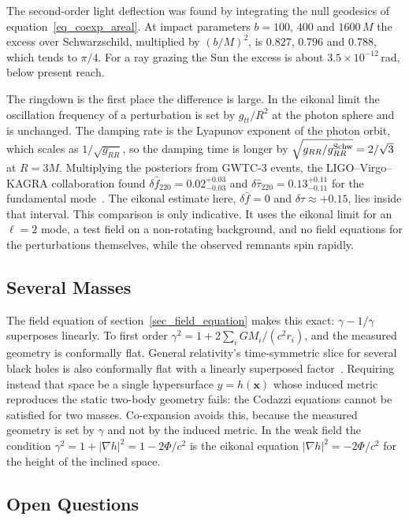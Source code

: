 The second-order light deflection was found by integrating the null geodesics of equation~\eqref{eq_coexp_areal}. At impact parameters $b=100$, $400$ and $1600\,M$ the excess over Schwarzschild, multiplied by $(b/M)^2$, is $0.827$, $0.796$ and $0.788$, which tends to $\pi/4$. For a ray grazing the Sun the excess is about $3.5\times10^{-12}$\,rad, below present reach.

The ringdown is the first place the difference is large. In the eikonal limit the oscillation frequency of a perturbation is set by $g_{tt}/R^2$ at the photon sphere and is unchanged. The damping rate is the Lyapunov exponent of the photon orbit, which scales as $1/\sqrt{g_{RR}}$, so the damping time is longer by $\sqrt{g_{RR}/g_{RR}^{\rm Schw}}=2/\sqrt3$ at $R=3M$. Multiplying the posteriors from GWTC-3 events, the LIGO--Virgo--KAGRA collaboration found $\delta\hat f_{220}=0.02^{+0.03}_{-0.03}$ and $\delta\hat\tau_{220}=0.13^{+0.11}_{-0.11}$ for the fundamental mode~\cite{LVK2025TGRGWTC3}. The eikonal estimate here, $\delta\hat f=0$ and $\delta\hat\tau\approx+0.15$, lies inside that interval. This comparison is only indicative. It uses the eikonal limit for an $\ell=2$ mode, a test field on a non-rotating background, and no field equations for the perturbations themselves, while the observed remnants spin rapidly.

\subsection{Several Masses}

The field equation of section~\ref{sec_field_equation} makes this exact: $\gamma-1/\gamma$ superposes linearly. To first order $\gamma^2=1+2\sum_iGM_i/(c^2r_i)$, and the measured geometry is conformally flat. General relativity's time-symmetric slice for several black holes is also conformally flat with a linearly superposed factor~\cite{BrillLindquist1963}. Requiring instead that space be a single hypersurface $y=h(\mathbf{x})$ whose induced metric reproduces the static two-body geometry fails: the Codazzi equations cannot be satisfied for two masses. Co-expansion avoids this, because the measured geometry is set by $\gamma$ and not by the induced metric. In the weak field the condition $\gamma^2=1+|\nabla h|^2=1-2\Phi/c^2$ is the eikonal equation $|\nabla h|^2=-2\Phi/c^2$ for the height of the inclined space.

\subsection{Open Questions}

